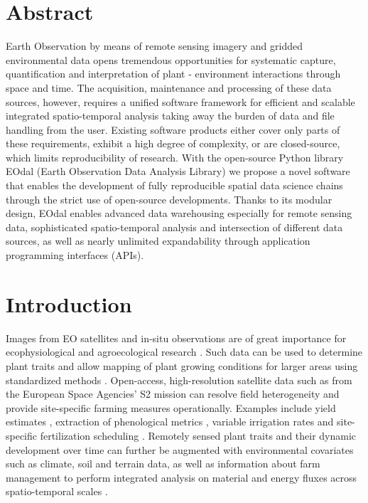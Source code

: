 \section*{Abstract}
Earth Observation by means of remote sensing imagery and gridded environmental data opens tremendous opportunities for systematic capture, quantification and interpretation of plant - environment interactions through space and time. The acquisition, maintenance and processing of these data sources, however, requires a unified software framework for efficient and scalable integrated spatio-temporal analysis taking away the burden of data and file handling from the user. Existing software products either cover only parts of these requirements, exhibit a high degree of complexity, or are closed-source, which limits reproducibility of research. With the open-source Python library EOdal (Earth Observation Data Analysis Library) we propose a novel software that enables the development of fully reproducible spatial data science chains through the strict use of open-source developments.
Thanks to its modular design, EOdal enables advanced data warehousing especially for remote sensing data, sophisticated spatio-temporal analysis and intersection of different data sources, as well as nearly unlimited expandability through application programming interfaces (APIs).

\section{Introduction}
Images from \gls{EO} satellites and in-situ observations are of great importance for ecophysiological \citep{caparros-santiago_land_2021} and agroecological research \citep{karthikeyan_review_2020}. Such data can be used to determine plant traits and allow mapping of plant growing conditions for larger areas using standardized methods \citep{weiss_remote_2020}. Open-access, high-resolution satellite data such as from the European Space Agencies' \gls{S2} mission can resolve field heterogeneity and provide site-specific farming measures operationally. Examples include yield estimates \citep{marshall_optimizing_2018,perich_pixel-based_2022}, extraction of phenological metrics \citep{duarte_qphenometrics_2018}, variable irrigation rates \citep{barker_evaluation_2018} and site-specific fertilization scheduling \citep{mittermayer_analysis_2022}. Remotely sensed plant traits and their dynamic development over time  can further be augmented with environmental covariates such as climate, soil and terrain data, as well as information about farm management to perform integrated analysis on material and energy fluxes across spatio-temporal scales \citep{asam_relationship_2018}.

